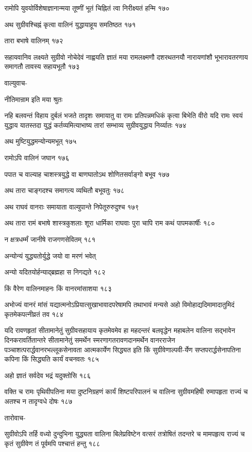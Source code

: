 रामोपि युवयोर्विशेषाज्ञानान्मया तूष्णीं भूतं चिह्नितं त्वा निरीक्ष्यतं हन्मि १७०

अथ सुग्रीवश्चिह्नं कृत्वा वालिनं युद्धायाहूय समतिष्ठत १७१

तारा बभाषे वालिनम् १७२

सहायवानिव लक्ष्यते सुग्रीवो नोचेदेवं नाह्वयति ज्ञातं मया रामलक्ष्मणौ दशरथतनयौ
नारायणांशौ भूभारावतरणाय समागतौ तावस्य सहायभूतौ १७३

वाल्युवाच-

नीतिमान्राम इति मया श्रुतः

नहि बलवन्तं विहाय दुर्बलं भजते तादृशः समायातु वा रामः प्रतिपन्नमधिकं कृत्वा बिभेति वीरो
यदि रामः स्वयं युद्धाय यातस्तदा युद्धं कर्तव्यमित्याभाष्य तारां सम्भाव्य सुग्रीवयुद्धाय
निर्य्यातः १७४

अथ मुष्टियुद्धमन्योन्यमभूत् १७५

रामोऽपि वालिनं जघान १७६

पपात च वाल्याह चाशस्त्रयुद्धे वा बाणघातोऽथ शोणितसर्वाङ्गो बभूव १७७

अथ तारा चाङ्गदश्च समागत्य व्यथितौ बभूवतुः १७८

अथ राघवं वानराः समायाता वाल्युपान्ते निपेतूरुरुदुश्च १७९

अथ तारा रामं बभाषे शास्त्रकुशलाः शूरा धार्मिका राघवाः पुरा चापि राम कथं
पापमकार्षीः १८०

न क्षत्रधर्म्मं जानीषे राजगणसेवितम् १८१

अन्योन्यं युद्ध्यतोर्युद्धे जयो वा मरणं भवेत्

अन्यो यदितयोर्हन्याद्ब्रह्महा स निगद्यते १८२

किं वैरेण वालिनमाहनः किं वानरमांसाशया १८३

अभोज्यं वानरं मांसं यद्यात्मनोऽप्रियात्सुखाभावादपरेषामपि तथाभावं मन्यसे अहो
विमोहाद्यदिमामादातुमिदं कृतमेकपत्नीव्रतं तव १८४

यदि रावणहृतां सीतामानेतुं सुग्रीवसहायाय कृतमेवमेव हा महदन्तरं बलवृद्धेन महाबलेन वालिना
सद्भावेन दिनकरावर्तितान्तरे सीतामानेतुं समर्थेन स्मरणागतरावणदानमर्थेन वानरराजेन
पञ्चाशत्परार्द्धवानरभल्लूकसेनावता आत्मकार्येण सिद्ध्यत इति किं सुग्रीवेणाल्पवी-र्येण
सप्तपरार्द्धसेनापतिना कपिना किं सिद्ध्यति कार्यं वचनवतः १८५

अहो ज्ञातं सर्वदेव भद्रं यदुक्तोसि १८६

वक्ति च रामः पृथिवीपतिना मया दुष्टनिग्रहणं कार्यं शिष्टपरिपालनं च वालिना
सुग्रीवमहिषी रुमापहृता राज्यं च अतश्च न तादृग्वधे दोषः १८७

तारोवाच-

सुग्रीवोऽपि तर्हि वध्यो दुन्दुभिना युद्ध्यता वालिना बिलेप्रविष्टेन वत्सरं तत्रोषितं तदन्तरे च
मामपहृत्य राज्यं च कृतं सुग्रीवेण तं पूर्वमपि पश्चात्तं हन्तु १८८

